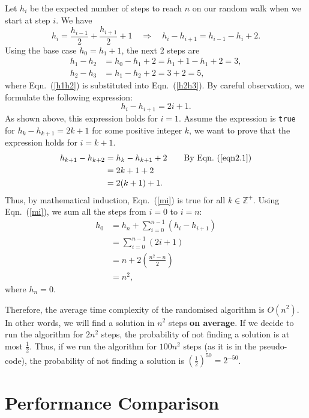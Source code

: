 \documentclass[11pt,fancychapters]{article}
\begin{document}
Let $h_i$ be the expected number of steps to reach $n$ on our random walk when we start at step $i$. We have
\begin{equation}\label{eqn2.1}
    h_i = \frac{h_{i-1}}{2} + \frac{h_{i+1}}{2} + 1 \quad \Rightarrow \quad h_i - h_{i+1} = h_{i-1} -h_i + 2.
\end{equation}
Using the base case $h_0 = h_1 + 1$, the next 2 steps are
\begin{align}
    h_1 - h_2 &= h_0 - h_1 + 2 = h_1 + 1 - h_1 + 2 = 3,\label{h1h2} \\
    h_2 - h_3 &= h_1 - h_2 + 2 = 3 +2 = 5,\label{h2h3}
\end{align}
where Eqn.~(\ref{h1h2}) is substituted into Eqn.~(\ref{h2h3}). By careful observation, we formulate the following expression:
\begin{equation}\label{mi}
    h_i - h_{i+1} = 2i+1.
\end{equation}
As shown above, this expression holds for $i=1$. Assume the expression is \texttt{true} for $h_k - h_{k+1} = 2k+1$ for some positive integer $k$, we want to prove that the expression holds for $i = k + 1$.
\begin{align*}
    h_{k+1} - h_{k+2} &= h_k - h_{k+1} + 2 \qquad \text{By Eqn.~(\ref{eqn2.1})}\\
    &= 2k+1+2\\
    &= 2(k+1) + 1.
\end{align*}
Thus, by mathematical induction, Eqn.~(\ref{mi}) is true for all $k \in \mathbb{Z}^+$. Using Eqn.~(\ref{mi}), we sum all the steps from $i = 0$ to $i = n$:
\begin{align*}
    h_0 &= h_n + \sum^{n-1}_{i=0}\left(h_i - h_{i+1}\right)\\
    &= \sum^{n-1}_{i=0}(2i+1)\\
    &= n+2\left(\frac{n^2-n}{2}\right)\\
    &= n^2,
\end{align*}
where $h_n = 0$.\newline

Therefore, the average time complexity of the randomised algorithm is $O(n^2)$. In other words, we will find a solution in $n^2$ steps \textbf{on average}. If we decide to run the algorithm for $2n^2$ steps, the probability of not finding a solution is at most $\frac{1}{2}$. Thus, if we run the algorithm for $100n^2$ steps (as it is in the pseudo-code), the probability of not finding a solution is $\left(\frac{1}{2}\right)^{50} = 2^{-50}$.


\newpage
\section{Performance Comparison}
\end{document}
